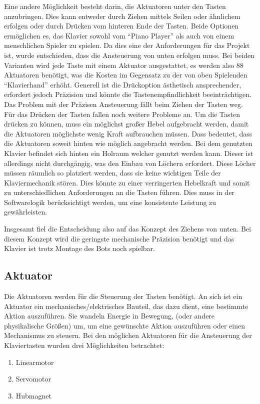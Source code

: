 Eine andere Möglichkeit besteht darin, die Aktuatoren unter den Tasten anzubringen. Dies kann entweder durch Ziehen mittels
Seilen oder ähnlichem erfolgen oder durch Drücken vom hinteren Ende der Tasten. Beide Optionen ermöglichen es, das Klavier sowohl vom
``Piano Player'' als auch von einem menschlichen Spieler zu spielen. Da dies eine der Anforderungen für das Projekt ist,
wurde entschieden, dass die Ansteuerung von unten erfolgen muss. Bei beiden Varianten wird jede Taste mit einem Aktuator
ausgestattet, es werden also 88 Aktuatoren benötigt, was die Kosten im Gegensatz zu der von oben Spielenden ``Klavierhand''
erhöht.
Generell ist die Drückoption ästhetisch ansprechender, erfordert jedoch Präzision und könnte die
Tastenempfindlichkeit beeinträchtigen. Das Problem mit der Präzisen Ansteuerung fällt beim Ziehen der Tasten weg.\newline
Für das Drücken der Tasten fallen noch weitere Probleme an. Um die Tasten drücken zu können, muss ein möglichst großer
Hebel aufgebracht werden, damit die Aktuatoren möglichste wenig Kraft aufbrauchen müssen. Dass bedeutet, dass
die Aktuatoren soweit hinten wie möglich angebracht werden.\newline
Bei dem genutzten Klavier befindet sich hinten ein Holraum welcher genutzt werden kann. Dieser ist allerdings
nicht durchgängig, was den
Einbau von Löchern erfordert. Diese Löcher müssen räumlich so platziert werden, dass sie keine wichtigen Teile der
Klaviermechanik stören. Dies könnte zu einer verringerten Hebelkraft und somit zu unterschiedlichen Anforderungen an
die Tasten führen. Dies muss in der Softwarelogik berücksichtigt werden, um eine konsistente Leistung zu gewährleisten.

Insgesamt fiel die Entscheidung also auf das Konzept des Ziehens von unten.
Bei diesem Konzept wird die geringste mechanische Präzision benötigt und das Klavier ist trotz Montage des Bots noch
spielbar.

\subsection{Aktuator}\label{subsec:aktuator}
Die Aktuatoren werden für die Steuerung der Tasten benötigt.
An sich ist ein Aktuator ein mechanisches/elektrisches Bauteil, das dazu dient,
eine bestimmte Aktion auszuführen.
Sie wandeln Energie in Bewegung, (oder andere physikalische Größen) um, um eine gewünschte Aktion auszuführen
oder einen Mechanismus zu steuern. \newline
Bei den möglichen Aktuatoren für die Ansteuerung der Klaviertasten wurden drei Möglichkeiten betrachtet:
\begin{enumerate}
	\item Linearmotor
	\item Servomotor
	\item Hubmagnet
\end{enumerate}

